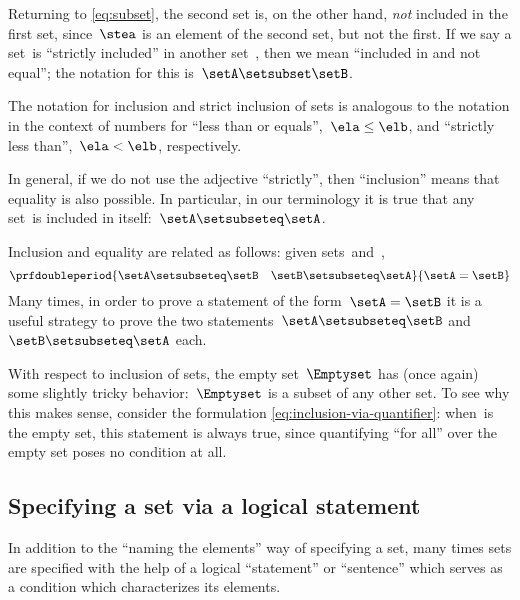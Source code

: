 Returning to \cref{eq:subset}, the second set is, on the other hand, \emph{not} included in the first set, since~$\stea$ is an element of the second set, but not the first.
If we say a set~\setA is ``strictly included'' in another set~\setB, then we mean ``included in and not equal''; the notation for this is~$\setA \setsubset \setB$.

The notation for inclusion and strict inclusion of sets is analogous to the notation in the context of numbers for ``less than or equals'',~$\ela \leq \elb$, and ``strictly less than'',~$\ela < \elb$, respectively.

In general, if we do not use the adjective ``strictly'', then ``inclusion'' means that equality is also possible.
In particular, in our terminology it is true that any set~\setA is included in itself:~$\setA \setsubseteq \setA$.

Inclusion and equality are related as follows: given sets~\setA and~\setB,
%
\begin{equation}
    \prfdoubleperiod
    {\setA \setsubseteq \setB
        \quad
        \setB \setsubseteq \setA}{
        \setA = \setB}
\end{equation}
%
Many times, in order to prove a statement of the form~$\setA = \setB$ it is a useful strategy to prove the two statements~$\setA \setsubseteq \setB$ and~$\setB \setsubseteq \setA$ each.

With respect to inclusion of sets, the empty set~$\Emptyset$ has (once again) some slightly tricky behavior:~$\Emptyset$ is a subset of any other set.
To see why this makes sense, consider the formulation \cref{eq:inclusion-via-quantifier}: when~\setA is the empty set, this statement is always true, since quantifying ``for all'' over the empty set poses no condition at all.

\subsection{Specifying a set via a logical statement}

In addition to the ``naming the elements'' way of specifying a set, many times sets are specified with the help of a logical ``statement'' or ``sentence'' which serves as a condition which characterizes its elements.

